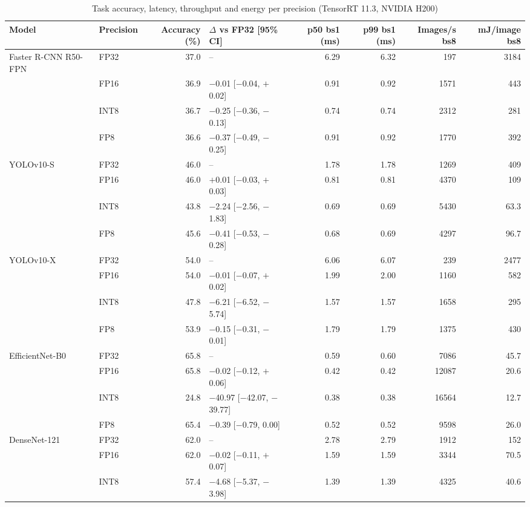 \documentclass[pdflatex,sn-mathphys-num]{sn-jnl}%
\theoremstyle{thmstyleone}%
\theoremstyle{thmstyletwo}%
\theoremstyle{thmstylethree}%
\begin{document}
\begin{table}
\footnotesize\setlength{\tabcolsep}{4pt}
\caption{Task accuracy, latency, throughput and energy per precision (TensorRT 11.3, NVIDIA H200)}\label{tab:accuracy}
\begin{tabular}{@{}llrlrrrr@{}}
\toprule
Model & Precision & Accuracy (\%) & $\Delta$ vs FP32 [95\% CI] & p50 bs1 (ms) & p99 bs1 (ms) & Images/s bs8 & mJ/image bs8 \\
\midrule
Faster R-CNN R50-FPN & FP32 & 37.0 & -- & 6.29 & 6.32 & 197 & 3184 \\
 & FP16 & 36.9 & $-$0.01 [$-$0.04, $+$0.02] & 0.91 & 0.92 & 1571 & 443 \\
 & INT8 & 36.7 & $-$0.25 [$-$0.36, $-$0.13] & 0.74 & 0.74 & 2312 & 281 \\
 & FP8 & 36.6 & $-$0.37 [$-$0.49, $-$0.25] & 0.91 & 0.92 & 1770 & 392 \\
\midrule
YOLOv10-S & FP32 & 46.0 & -- & 1.78 & 1.78 & 1269 & 409 \\
 & FP16 & 46.0 & $+$0.01 [$-$0.03, $+$0.03] & 0.81 & 0.81 & 4370 & 109 \\
 & INT8 & 43.8 & $-$2.24 [$-$2.56, $-$1.83] & 0.69 & 0.69 & 5430 & 63.3 \\
 & FP8 & 45.6 & $-$0.41 [$-$0.53, $-$0.28] & 0.68 & 0.69 & 4297 & 96.7 \\
\midrule
YOLOv10-X & FP32 & 54.0 & -- & 6.06 & 6.07 & 239 & 2477 \\
 & FP16 & 54.0 & $-$0.01 [$-$0.07, $+$0.02] & 1.99 & 2.00 & 1160 & 582 \\
 & INT8 & 47.8 & $-$6.21 [$-$6.52, $-$5.74] & 1.57 & 1.57 & 1658 & 295 \\
 & FP8 & 53.9 & $-$0.15 [$-$0.31, $-$0.01] & 1.79 & 1.79 & 1375 & 430 \\
\midrule
EfficientNet-B0 & FP32 & 65.8 & -- & 0.59 & 0.60 & 7086 & 45.7 \\
 & FP16 & 65.8 & $-$0.02 [$-$0.12, $+$0.06] & 0.42 & 0.42 & 12087 & 20.6 \\
 & INT8 & 24.8 & $-$40.97 [$-$42.07, $-$39.77] & 0.38 & 0.38 & 16564 & 12.7 \\
 & FP8 & 65.4 & $-$0.39 [$-$0.79, 0.00] & 0.52 & 0.52 & 9598 & 26.0 \\
\midrule
DenseNet-121 & FP32 & 62.0 & -- & 2.78 & 2.79 & 1912 & 152 \\
 & FP16 & 62.0 & $-$0.02 [$-$0.11, $+$0.07] & 1.59 & 1.59 & 3344 & 70.5 \\
 & INT8 & 57.4 & $-$4.68 [$-$5.37, $-$3.98] & 1.39 & 1.39 & 4325 & 40.6 \\

\end{tabular}
\end{table}
\end{document}
